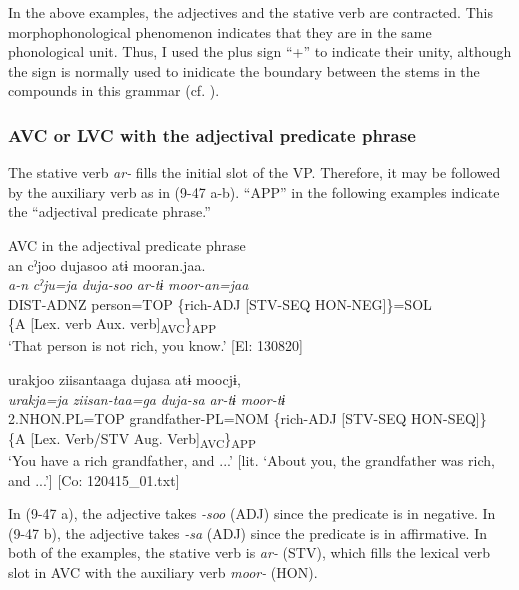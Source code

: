 In the above examples, the adjectives and the stative verb are contracted. This morphophonological phenomenon indicates that they are in the same phonological unit. Thus, I used the plus sign “+” to indicate their unity, although the sign is normally used to inidicate the boundary between the stems in the compounds in this grammar (cf. ).

\subsubsection{AVC or LVC with the adjectival predicate phrase}\label{sec:9.2.2.3}

The stative verb \textit{ar-} fills the initial slot of the VP. Therefore, it may be followed by the auxiliary verb as in (9-47 a-b). “APP” in the following examples indicate the “adjectival predicate phrase.”

\ea   AVC in the adjectival predicate phrase \label{ex:9.47}
\ea\relax [= (8-48)]\\
    \gllll  an  cˀjoo  dujasoo  atɨ  mooran.jaa.\\
      \textit{a-n}  \textit{cˀju=ja}  \textit{duja-soo}  \textit{ar-tɨ}  \textit{moor-an=jaa}\\
      DIST-ADNZ  person=TOP  \{rich-ADJ  [STV-SEQ  HON-NEG]\}=SOL\\
          \{A  [Lex. verb  Aux. verb]\textsubscript{AVC}\}\textsubscript{APP}\\
      \glt       ‘That person is not rich, you know.’ [El: 130820]

\ex \label{ex:9.47b} %
    \gllll  urakjoo  ziisantaaga  dujasa  atɨ   moocjɨ,\\
      \textit{urakja=ja}  \textit{ziisan-taa=ga}  \textit{duja-sa}  \textit{ar-tɨ}  \textit{moor-tɨ}\\
      2.NHON.PL=TOP  grandfather-PL=NOM  \{rich-ADJ  [STV-SEQ  HON-SEQ]\}\\
          \{A  [Lex. Verb/STV   Aug. Verb]\textsubscript{AVC}\}\textsubscript{APP}\\
      \glt       ‘You have a rich grandfather, and ...’ [lit. ‘About you, the grandfather was rich, and ...’] [Co: 120415\_01.txt]
    \z
\z

In (9-47 a), the adjective takes \textit{{}-soo} (ADJ) since the predicate is in negative. In (9-47 b), the adjective takes \textit{{}-sa} (ADJ) since the predicate is in affirmative. In both of the examples, the stative verb is \textit{ar-} (STV), which fills the lexical verb slot in AVC with the auxiliary verb \textit{moor-} (HON).

